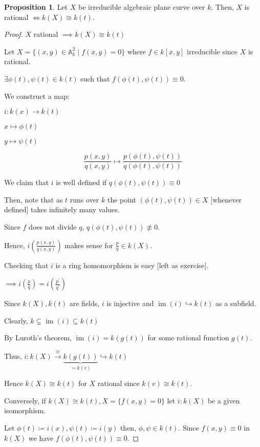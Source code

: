 \documentclass{article}
\theoremstyle{definition}
\newtheorem{proposition}[theorem]{Proposition}
\begin{document}
        \begin{proposition}
            Let \(X\) be irreducible algebraic plane curve over \(k\). Then, \(X\) is rational \(\iff k(X) \cong k(t)\).
        \end{proposition}

        \begin{proof}
            \(X\) rational \(\implies k(X) \cong k(t)\)

            Let \(X = \{ (x,y)\in \mathbb{A}^2_k \mid f(x,y)=0 \}\) where \(f\in k[x,y]\) irreducible since \(X\) is rational.

            \(\exists \phi (t), \psi (t)\in k(t)\) such that \(f(\phi (t),\psi (t))\equiv 0\).

            We construct a map:

            \(i: k(x) \to k(t)\) 

            \(x \mapsto \phi(t)\) 

            \(y \mapsto \psi(t)\) 

            \[
                \frac{p(x,y)}{q(x,y)} \mapsto \frac{p(\phi(t),\psi(t))}{q(\phi(t),\psi(t))}
            \]

            We claim that \(i\) is well defined if \(q(\phi(t),\psi(t))\equiv 0\)

            Then, note that as \(t\) runs over \(k\) the point \((\phi(t),\psi(t))\in X\) [whenever defined] takes infinitely many values.
            
            Since \(f\) does not divide \(q\), \(q(\phi(t),\psi(t))\not\equiv 0\).
            
            Hence, \(i \left( \frac{p(x,y)}{q(x,y)} \right)\) makes sense for \(\frac{p}{q}\in k(X)\).
            
            Checking that \(i\) is a ring homomorphism is easy [left as exercise].

            \(\implies i \left( \frac{p}{q} \right) = i \left( \frac{p^{\prime}}{q^{\prime}} \right) \)

            Since \(k(X),k(t)\) are fields, \(i\) is injective and \(\operatorname{im} (i) \hookrightarrow k(t)\) as a subfield.

            Clearly, \(k \subsetneq \operatorname{im} (i) \subseteq k(t)\) 

            By Luroth's theorem, \(\operatorname{im} (i) = k(g(t))\) for some rational function \(g(t)\).

            Thus, \(i: k(X) \xrightarrow{\cong} \underbrace{k(g(t))}_{=k(v)} \hookrightarrow k(t)\)

            Hence \(k(X) \cong k(t)\) for \(X\) rational since \(k(v) \cong k(t)\).

            Conversely, if \(k(X) \cong k(t), X = \{ f(x,y)=0 \}\) let \(i: k(X)\) be a given isomorphism.

            Let \(\phi (t) \coloneqq i(x), \psi (t) \coloneqq i(y)\) then, \(\phi , \psi \in k(t)\). Since \(f(x,y)\equiv 0\) in \(k(X)\) we have \(f(\phi(t),\psi(t))\equiv 0\).

        \end{proof}
\end{document}
